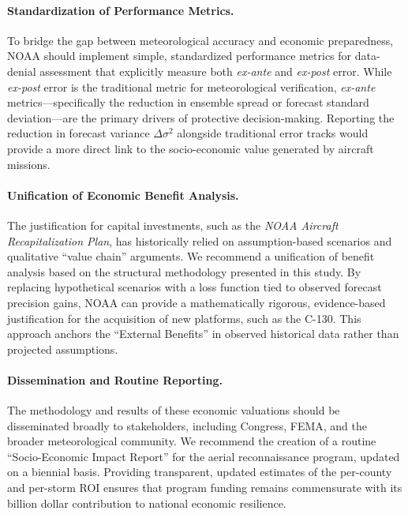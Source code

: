 \documentclass[12pt]{article}%
\begin{document}
\paragraph{Standardization of Performance Metrics.}
To bridge the gap between meteorological accuracy and economic preparedness, NOAA should implement simple, standardized performance metrics for data-denial assessment that explicitly measure both \textit{ex-ante} and \textit{ex-post} error. While \textit{ex-post} error is the traditional metric for meteorological verification, \textit{ex-ante} metrics---specifically the reduction in ensemble spread or forecast standard deviation---are the primary drivers of protective decision-making. Reporting the reduction in forecast variance $\Delta \sigma^2$ alongside traditional error tracks would provide a more direct link to the socio-economic value generated by aircraft missions.

\paragraph{Unification of Economic Benefit Analysis.}
The justification for capital investments, such as the \textit{NOAA Aircraft Recapitalization Plan}, has historically relied on assumption-based scenarios and qualitative ``value chain'' arguments. We recommend a unification of benefit analysis based on the structural methodology presented in this study. By replacing hypothetical scenarios with a loss function tied to observed forecast precision gains, NOAA can provide a mathematically rigorous, evidence-based justification for the acquisition of new platforms, such as the C-130. This approach anchors the ``External Benefits'' in observed historical data rather than projected assumptions.

\paragraph{Dissemination and Routine Reporting.}
The methodology and results of these economic valuations should be disseminated broadly to stakeholders, including Congress, FEMA, and the broader meteorological community. We recommend the creation of a routine ``Socio-Economic Impact Report'' for the aerial reconnaissance program, updated on a biennial basis. Providing transparent, updated estimates of the per-county and per-storm ROI ensures that program funding remains commensurate with its billion dollar contribution to national economic resilience.


\end{document}
